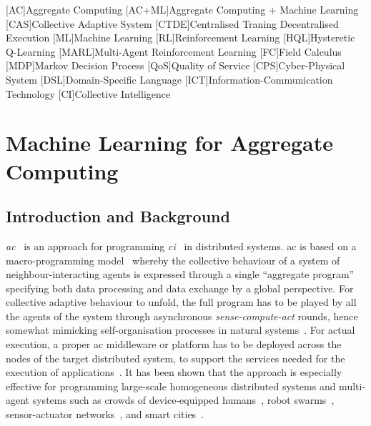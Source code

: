 \newcommand{\meta}[1]{{\color{blue}#1}}

\newcommand{\todos}[1]{\todo[inline, color=cyan]{\textbf{TODO}: #1}}
\newcommand{\constraints}[1]{\todo[inline, color=red]{#1}}
\newcommand{\suggestions}[1]{\todo[inline, color=yellow]{#1}}    
\newcommand{\hybridaggregate}[0]{AC+ML}

[AC]{Aggregate Computing}
[AC+ML]{Aggregate Computing + Machine Learning}
[CAS]{Collective Adaptive System}
[CTDE]{Centralised Traning Decentralised Execution}
[ML]{Machine Learning}
[RL]{Reinforcement Learning}
[HQL]{Hysteretic Q-Learning}
[MARL]{Multi-Agent Reinforcement Learning}
[FC]{Field Calculus}
[MDP]{Markov Decision Process}
[QoS]{Quality of Service}
[CPS]{Cyber-Physical System}
[DSL]{Domain-Specific Language}
[ICT]{Information-Communication Technology}
[CI]{Collective Intelligence}
\sloppypar    
\chapter{Machine Learning for Aggregate Computing}

\section{Introduction and Background}

\emph{\ac{ac}}~\cite{DBLP:journals/computer/BealPV15,DBLP:journals/jlap/ViroliBDACP19,DBLP:journals/eaai/CasadeiVAPD21}
 is an approach
 for programming
 \emph{\ac{ci}}~\cite{DBLP:journals/fgcs/Szuba01,DBLP:journals/jair/WolpertT02} in 
 distributed systems.
%
\ac{ac} is based on a macro-programming model~\cite{DBLP:journals/corr/abs-2201-03473,beal2013organizing-aggregate,DBLP:conf/ipsn/NewtonMW07}
 whereby the collective behaviour of a system
 of neighbour-interacting agents 
 is expressed through a single ``aggregate program''
 specifying both data processing and data exchange by a global perspective.
%
For collective adaptive behaviour to unfold,
 the full program has to be played by all the agents
 of the system
 through asynchronous \emph{sense-compute-act} rounds,
 hence somewhat mimicking self-organisation processes in natural systems~\cite{yates2012selforg}.
%
For actual execution,
 a proper \ac{ac} middleware or platform
 has to be deployed across the nodes of the target distributed system,
 to support the services
 needed for the execution of applications~\cite{DBLP:journals/fi/CasadeiPPVW20,DBLP:journals/iotj/RazzaqueMPC16}.
%
It has been shown 
 that the approach is especially effective
 for programming 
 large-scale homogeneous distributed systems
 and multi-agent systems 
 such as crowds of device-equipped humans~\cite{DBLP:journals/computer/BealPV15},
 robot swarms~\cite{DBLP:journals/eaai/CasadeiVAPD21},
 sensor-actuator networks~\cite{DBLP:journals/cee/AudritoCDPV21}, and
 smart cities~\cite{DBLP:journals/fi/CasadeiPPVW20}. %

